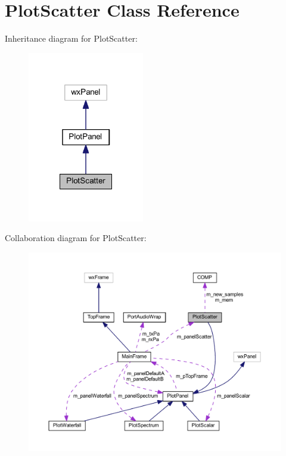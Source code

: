 \hypertarget{class_plot_scatter}{\section{Plot\-Scatter Class Reference}
\label{class_plot_scatter}
}


Inheritance diagram for Plot\-Scatter\-:\nopagebreak
\begin{figure}[H]
\begin{center}
\leavevmode
\includegraphics[width=144pt]{class_plot_scatter__inherit__graph}
\end{center}
\end{figure}


Collaboration diagram for Plot\-Scatter\-:\nopagebreak
\begin{figure}[H]
\begin{center}
\leavevmode
\includegraphics[width=350pt]{class_plot_scatter__coll__graph}
\end{center}
\end{figure}

